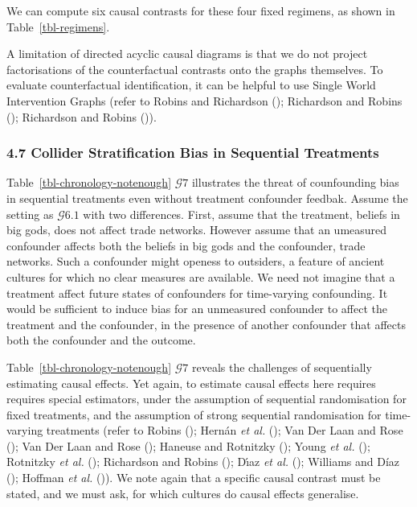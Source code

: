 \documentclass[
  single column]{article}
\begin{document}
We can compute six causal contrasts for these four fixed regimens, as
shown in Table~\ref{tbl-regimens}.

A limitation of directed acyclic causal diagrams is that we do not
project factorisations of the counterfactual contrasts onto the graphs
themselves. To evaluate counterfactual identification, it can be helpful
to use Single World Intervention Graphs (refer to Robins and Richardson
(); Richardson and Robins
(); Richardson and Robins
()).

\subsubsection{4.7 Collider Stratification Bias in Sequential
Treatments}\label{collider-stratification-bias-in-sequential-treatments}

Table~\ref{tbl-chronology-notenough} \(\mathcal{G} 7\) illustrates the
threat of counfounding bias in sequential treatments even without
treatment confounder feedbak. Assume the setting as \(\mathcal{G} 6.1\)
with two differences. First, assume that the treatment, beliefs in big
gods, does not affect trade networks. However assume that an umeasured
confounder affects both the beliefs in big gods and the confounder,
trade networks. Such a confounder might openess to outsiders, a feature
of ancient cultures for which no clear measures are available. We need
not imagine that a treatment affect future states of confounders for
time-varying confounding. It would be sufficient to induce bias for an
unmeasured confounder to affect the treatment and the confounder, in the
presence of another confounder that affects both the confounder and the
outcome.

Table~\ref{tbl-chronology-notenough} \(\mathcal{G} 7\) reveals the
challenges of sequentially estimating causal effects. Yet again, to
estimate causal effects here requires requires special estimators, under
the assumption of sequential randomisation for fixed treatments, and the
assumption of strong sequential randomisation for time-varying
treatments (refer to Robins (); Hernán
\emph{et al.} (); Van Der Laan
and Rose (); Van Der Laan and Rose
(); Haneuse and Rotnitzky
(); Young \emph{et al.}
(); Rotnitzky \emph{et al.}
(); Richardson and Robins
(); Dı́az \emph{et al.}
(); Williams and Díaz
(); Hoffman \emph{et al.}
()). We note again that a specific
causal contrast must be stated, and we must ask, for which cultures do
causal effects generalise.
\end{document}
